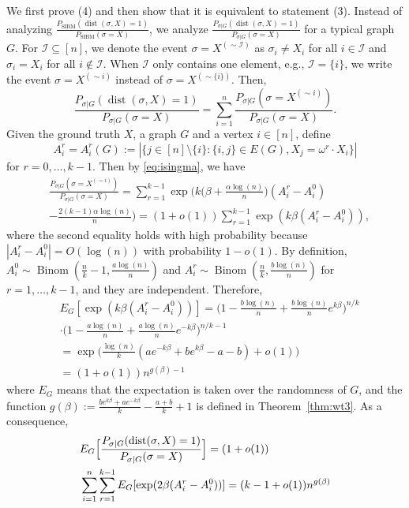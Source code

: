 \documentclass[conference]{IEEEtran}
\DeclareMathOperator{\SIBM}{SIBM}
\newcommand{\cI}{\mathcal{I}}
\DeclareMathOperator{\dist}{dist}
\DeclareMathOperator{\Binom}{Binom}
\begin{document}
We first prove (4) and then show that it is equivalent to statement (3).
Instead of analyzing $\frac{P_{\SIBM} ( \dist(\sigma, X) = 1 )}{P_{\SIBM}(\sigma= X)}$, we analyze $\frac{P_{\sigma|G} ( \dist(\sigma, X) = 1 )}{P_{\sigma|G}(\sigma= X)}$ for a typical graph $G$.
For $\cI \subseteq [n]$, we denote the event $\sigma = X^{(\sim \cI)}$ as $\sigma_i \neq X_i$ for all $i \in \cI$ and $\sigma_i = X_i$ for all $i \not\in \cI$.
When $\cI$ only contains one element, e.g., $\cI=\{i\}$, we write the event $\sigma = X^{(\sim i)}$ instead of $\sigma = X^{(\sim\{i\})}$.
Then,
$$
\frac{P_{\sigma|G} ( \dist(\sigma, X) = 1 )}{P_{\sigma|G}(\sigma= X)}
=\sum_{i=1}^n \frac{P_{\sigma|G} ( \sigma= X^{(\sim i)} )} {P_{\sigma|G}(\sigma= X)} .
$$
Given the ground truth $X$, a graph $G$ and a vertex $i\in[n]$, define
\begin{equation*}
A^r_i=A^r_i(G):=|\{j\in[n]\setminus\{i\}:\{i,j\}\in E(G), X_j=\omega^r \cdot X_i\} |
\end{equation*}
for $ r=0, \dots, k-1$.
Then by \eqref{eq:isingma}, we have
\begin{align*}
&\frac{P_{\sigma|G}(\sigma=X^{(\sim i)} )}
{P_{\sigma|G}(\sigma=X)}
 = \sum_{r=1}^{k-1}\exp\Big(k\big(\beta+\frac{\alpha\log(n)}{n} \big) (A^r_i-A^0_i) \\
&-\frac{2(k-1)\alpha\log(n)}{n} \Big) 
 = (1+o(1)) \sum_{r=1}^{k-1}\exp (k \beta(A^r_i-A^0_i))  ,
\end{align*}
where the second equality holds with high probability because $|A^r_i-A^0_i|=O(\log(n))$ with probability $1-o(1)$.
By definition,
$A^0_i\sim \Binom(\frac{n}{k}-1,\frac{a\log(n)}{n})$ and $A^r_i\sim \Binom(\frac{n}{k}, \frac{b\log(n)}{n})$ for $r=1,\dots, k-1$, and they are independent. Therefore,
\begin{align*}
&E_G[\exp (k \beta (A^r_i-A^0_i))]
 =\Big(1-\frac{b\log(n)}{n}+\frac{b\log(n)}{n} e^{k\beta} \Big)^{n/k} \\
&\cdot \Big(1-\frac{a\log(n)}{n}+\frac{a\log(n)}{n} e^{-k\beta} \Big)^{n/k-1}\\
& = 
\exp\Big(\frac{\log(n)}{k} ( a e^{-k\beta}+b e^{k\beta} -a-b )
+o(1) \Big) \\
& = (1+o(1)) n^{g(\beta)-1} 
\end{align*}
where $E_G$ means that the expectation is taken over the randomness of $G$, and the function
$g(\beta)  := \frac{b e^{k\beta}+a e^{-k\beta}}{k}-\frac{a+b}{k}+1$ is defined in Theorem~\ref{thm:wt3}.
As a consequence,
\begin{align} \label{eq:mew}
&E_G \Big[ \frac{P_{\sigma|G} ( \dist(\sigma, X) = 1 )}{P_{\sigma|G}(\sigma= X)} \Big]
= (1+o(1)) \notag\\
&\sum_{i=1}^n\sum_{r=1}^{k-1} E_G[\exp (2 \beta (A^r_i-A^0_i))]
= (k-1+o(1)) n^{g(\beta)} 
\end{align}
\end{document}
